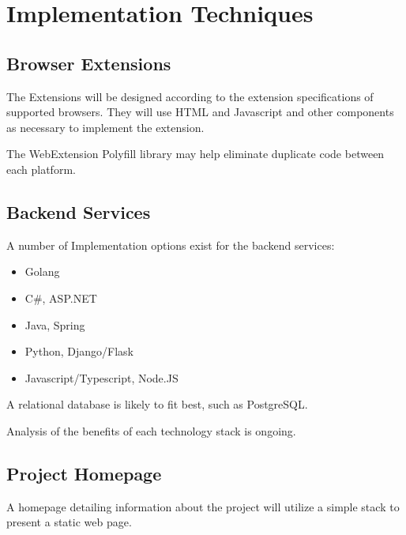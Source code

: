\documentclass[proposal.tex]{subfiles}
\begin{document}
    
\section{Implementation Techniques}

\subsection{Browser Extensions}

The Extensions will be designed according to the extension specifications of supported browsers. They will use HTML and Javascript and other components as necessary to implement the extension. 

The WebExtension Polyfill library may help eliminate duplicate code between each platform.


\subsection{Backend Services}

A number of Implementation options exist for the backend services:

\begin{itemize}
    \item Golang 
    \item C\#, ASP.NET
    \item Java, Spring
    \item Python, Django/Flask
    \item Javascript/Typescript, Node.JS
\end{itemize}

A relational database is likely to fit best, such as PostgreSQL.

Analysis of the benefits of each technology stack is ongoing.


\subsection{Project Homepage}

A homepage detailing information about the project will utilize a simple stack to present a static web page.
\end{document}
